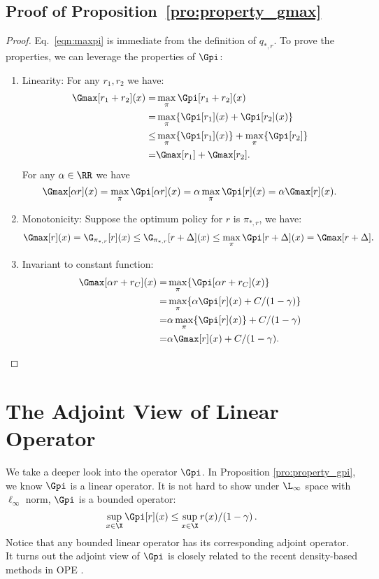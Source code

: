 \subsection{Proof of Proposition~\ref{pro:property_gmax}}
\begin{proof}
Eq.~\eqref{eqn:maxpi} is immediate from the definition of $q_{*,r}$.
To prove the properties, we can leverage the properties of $\Gpi$:
\begin{enumerate}
    \item Linearity: For any $r_1, r_2$ we have:
    \begin{align*}
        \Gmax[r_1 + r_2](x) =& \max_\pi \Gpi[r_1 + r_2](x) \\
        =& \max_\pi \{\Gpi[r_1](x) + \Gpi[r_2](x)\} \\
        \leq & \max_\pi \{\Gpi[r_1](x)\} + \max_\pi \{\Gpi[r_2]\} \\
        =& \Gmax[r_1] + \Gmax[r_2].
    \end{align*}
    For any $\alpha\in \RR$ we have
    $$\Gmax[\alpha r](x) = \max_\pi \Gpi[\alpha r](x) = \alpha \max_\pi \Gpi[r](x) = \alpha \Gmax[r](x).$$
    \item Monotonicity: Suppose the optimum policy for $r$ is $\pi_{*,r}$, we have:
    \begin{align*}
        \Gmax[r](x) = \G_{\pi_{*,r}}[r](x) \leq \G_{\pi_{*,r}}[r+\Delta](x) \leq \max_\pi \Gpi[r+\Delta](x) = \Gmax[r+\Delta].
    \end{align*}
    \item Invariant to constant function:
    \begin{align*}
        \Gmax[\alpha r + r_C](x) =& \max_\pi \{\Gpi[\alpha r + r_C](x)\} \\
        =& \max_\pi \{\alpha\Gpi[r](x) + C/(1-\gamma)\} \\
        =& \alpha \max_\pi \{\Gpi[r](x)\} + C/(1-\gamma) \\
        =& \alpha \Gmax[r](x) + C/(1-\gamma).
    \end{align*}
\end{enumerate}

\end{proof}


\clearpage
\section{The Adjoint View of Linear Operator}
\label{sec:adjoint}

We take a deeper look into the operator $\Gpi$.
In Proposition \ref{pro:property_gpi}, we know $\Gpi$ is a linear operator.
It is not hard to show under $\L_{\infty}$ space with $\ell_\infty$ norm, $\Gpi$ is a bounded operator:
$$
    \sup_{x\in \X} \Gpi [r](x) \leq \sup_{x\in \X} r(x) / (1 - \gamma)\,.
$$
Notice that any bounded linear operator has its corresponding adjoint operator.
It turns out the adjoint view of $\Gpi$ is closely related to the recent density-based methods in OPE \citep{tang2019doubly, nachum2020reinforcement, uehara2020minimax, jiang2020minimax}. 

